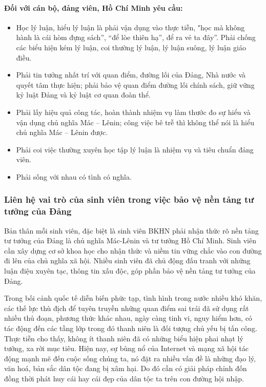 \paragraph{Đối với cán bộ, đảng viên, Hồ Chí Minh yêu cầu:}
\begin{itemize}
    \item Học lý luận, hiểu lý luận là phải vận dụng vào thực tiễn, "học mà không hành là cái hòm đựng sách”, “để lòe thiên hạ”, để ra vẻ ta đây”. Phải chống các biểu hiện kém lý luận, coi thường lý luận, lý luận suông, lý luận giáo điều.
    \item Phải tin tưởng nhất trí với quan điểm, đường lối của Đảng, Nhà nước và quyết tâm thực hiện; phải bảo vệ quan điểm đường lối chính sách, giữ vững kỷ luật Đảng và kỷ luật cơ quan đoàn thể.
    \item Phải lấy hiệu quả công tác, hoàn thành nhiệm vụ làm thước đo sự hiểu và vận dụng chủ nghĩa Mác – Lênin; công việc bê trễ thì không thể nói là hiểu chủ nghĩa Mác – Lênin được.
    \item Phải coi việc thường xuyên học tập lý luận là nhiệm vụ và tiêu chuẩn đảng viên.
    \item Phải sống với nhau có tình có nghĩa.
\end{itemize}

\subsubsection{Liên hệ vai trò của sinh viên trong việc bảo vệ nền tảng tư tưởng của Đảng}

Bản thân mỗi sinh viên, đặc biệt là sinh viên BKHN phải nhận thức rõ nền tảng tư tưởng của Đảng là chủ nghĩa Mác-Lênin và tư tưởng Hồ Chí Minh. Sinh viên cần xây dựng cơ sở khoa học cho nhận thức và niềm tin vững chắc vào con đường đi lên của chủ nghĩa xã hội. Nhiều sinh viên đã chủ động đấu tranh với những luận điệu xuyên tạc, thông tin xấu độc, góp phần bảo vệ nền tảng tư tưởng của Đảng.

Trong bối cảnh quốc tế diễn biến phức tạp, tình hình trong nước nhiều khó khăn, các thế lực thù địch để tuyên truyền những quan điểm sai trái đã sử dụng rất nhiều thủ đoạn, phương thức khác nhau, ngày càng tinh vi, nguy hiểm hơn, có tác động đến các tầng lớp trong đó thanh niên là đối tượng chủ yếu bị tấn công. Thực tiễn cho thấy, không ít thanh niên đã có những biểu hiện phai nhạt lý tưởng, xa rời mục tiêu. Hiện nay, sự bùng nổ của Internet và mạng xã hội tác động mạnh mẽ đến cuộc sống chúng ta, nó đặt ra nhiều vấn đề là những đạo lý, văn hoá, bản sắc dân tộc đang bị xâm hại. Do đó cần có giải pháp chỉnh đốn đồng thời phát huy cái hay cái đẹp của dân tộc ta trên con đường hội nhập.

